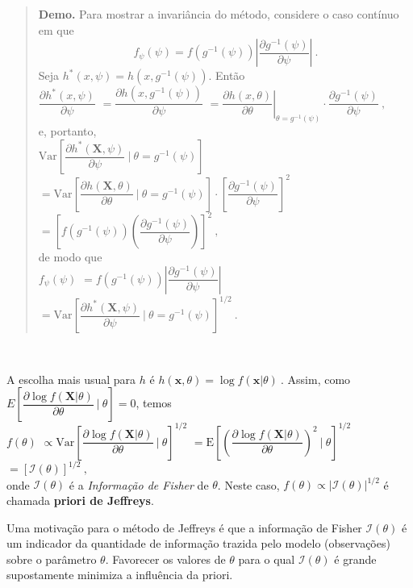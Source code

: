 \documentclass[
]{book}
\begin{document}
\begin{quote}
\textbf{Demo.} Para mostrar a invariância do método, considere o caso contínuo em que
\[f_\psi(\psi) = f\left(g^{-1}(\psi)\right)\left|\dfrac{\partial g^{-1}(\psi)}{\partial\psi}\right|~.\]
Seja \(h^*(x,\psi)=h\left(x,g^{-1}(\psi)\right)\). Então\\
\(\dfrac{\partial h^*(x,\psi)}{\partial\psi}\)
\(=\dfrac{\partial h\left(x,g^{-1}(\psi)\right)}{\partial\psi}\)
\(=\left.\dfrac{\partial h(x,\theta)}{\partial\theta}\right|_{\theta=g^{-1}(\psi)}\cdot\dfrac{\partial g^{-1}(\psi)}{\partial\psi}~,\)\\
e, portanto,\\
\(\text{Var}\left[\dfrac{\partial h^*(\boldsymbol{X},\psi)}{\partial\psi}~\bigg|~\theta=g^{-1}(\psi)\right]\)
\(=\text{Var}\left[\dfrac{\partial h(\boldsymbol{X},\theta)}{\partial\theta}~\bigg|~\theta=g^{-1}(\psi)\right]\cdot\left[\dfrac{\partial g^{-1}(\psi)}{\partial\psi}\right]^2\)
\(=\left[f\left(g^{-1}(\psi)\right)\left(\dfrac{\partial g^{-1}(\psi)}{\partial\psi}\right)\right]^2~,\)\\
de modo que\\
\(f_\psi(\psi)\) \(=f\left(g^{-1}(\psi)\right)\left|\dfrac{\partial g^{-1}(\psi)}{\partial\psi}\right|\)
\(=\text{Var}\left[\dfrac{\partial h^*(\boldsymbol{X},\psi)}{\partial\psi}~\bigg|~\theta=g^{-1}(\psi)\right]^{1/2}~.\)
\end{quote}

\(~\)

A escolha mais usual para \(h\) é \(h(\boldsymbol{x},\theta)=\log f(\boldsymbol{x}|\theta)~.\) Assim, como \(E\left[\dfrac{\partial \log f(\boldsymbol{X}|\theta)}{\partial\theta}~\bigg|~\theta\right]=0\), temos\\
\(f(\theta)\)
\(\propto\text{Var}\left[\dfrac{\partial \log f(\boldsymbol{X}|\theta)}{\partial\theta}~\bigg|~\theta\right]^{1/2}\)
\(=\text{E}\left[\left(\dfrac{\partial \log f(\boldsymbol{X}|\theta)}{\partial\theta}\right)^2~\bigg|~\theta\right]^{1/2}\)
\(=\left[\mathcal{I}(\theta)\right]^{1/2}~,\)\\
onde \(\mathcal{I}(\theta)\) é a \emph{Informação de Fisher} de \(\theta\). Neste caso, \(f(\theta)\propto\big|\mathcal{I}(\theta)\big|^{1/2}\) é chamada \textbf{priori de Jeffreys}.

Uma motivação para o método de Jeffreys é que a informação de Fisher \(\mathcal{I}(\theta)\) é um indicador da quantidade de informação trazida pelo modelo (observações) sobre o parâmetro \(\theta\). Favorecer os valores de \(\theta\) para o qual \(\mathcal{I}(\theta)\) é grande supostamente minimiza a influência da priori.
\end{document}
